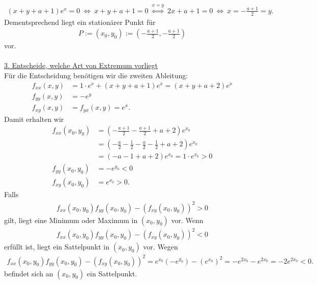 \begin{align*}
(x+y+ a +1 ) e^x = 0
\ \Leftrightarrow \
x +y +a + 1 = 0
\ \overset{x = y}{\Leftrightarrow} \
2x  + a +1 = 0
\ \Leftrightarrow \
x = -\frac{a+1}{2} = y.
\end{align*}
Dementsprechend liegt ein stationärer Punkt für
\begin{align*}
P := (x_0,y_0):= \left( - \frac{a+1}{2}, - \frac{a+1}{2}\right)
\end{align*}
vor.\\
\\
\underline{3. Entscheide, welche Art von Extremum vorliegt}\\
Für die Entscheidung benötigen wir die zweiten Ableitung:
\begin{align*}
f_{xx}(x,y)
&= 1 \cdot e^x + (x+y+a+1)e^x  
=
(x+y+a+2) e^x\\
f_{yy}(x,y)&=
-e^y\\
f_{xy}(x,y) &=
f_{yx}(x,y)
=
e^x.
\end{align*}
Damit erhalten wir 
\begin{align*}
f_{xx}(x_0,y_0)
&=
\left(
-\frac{a+1}{2} - \frac{a+1}{2} + a + 2 
\right) e^{x_0}\\
&=
\left(
-\frac{a}{2} - \frac{1}{2}  - \frac{a}{2} - \frac{1}{2} + a + 2 
\right) e^{x_0}\\
&=
(-a -1 + a + 2)e^{x_0}
= 1 \cdot e^{x_0} > 0\\
f_{yy}(x_0,y_0)
&=
-e^{y_0} < 0\\
f_{xy}(x_0,y_0) &= e^{x_0} > 0.
\end{align*}
Falls 
\begin{align*}
f_{xx}(x_0,y_0) f_{yy}(x_0,y_0)-
(f_{xy}(x_0,y_0))^2 > 0
\end{align*}
gilt, liegt eine Minimum oder Maximum in $ (x_0,y_0) $ vor. Wenn 
\begin{align*}
f_{xx}(x_0,y_0) f_{yy}(x_0,y_0)-
(f_{xy}(x_0,y_0))^2 < 0
\end{align*}
erfüllt ist, liegt ein Sattelpunkt in $ (x_0,y_0) $ vor.
Wegen
\begin{align*}
f_{xx}(x_0,y_0) f_{yy}(x_0,y_0)-
(f_{xy}(x_0,y_0))^2
=e^{x_0} (-e^{y_0} )- ( e^{x_0})^2
=-e^{2x_0} - e^{2x_0} 
= -2 e^{2x_0} < 0. 
\end{align*}
befindet sich an $ (x_0,y_0) $ ein Sattelpunkt.
\newpage

